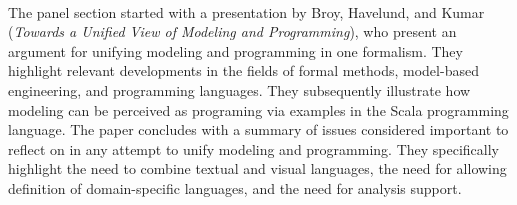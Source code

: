 

\ \hline \ %

The panel section started with a presentation by
Broy, Havelund, and Kumar
\cite{isola-2016-broy}
({\em Towards a Unified View of Modeling and Programming}),
who present an argument for unifying modeling and programming in 
one formalism. They highlight relevant developments in the fields 
of formal methods, model-based engineering, and programming 
languages. They subsequently illustrate how modeling can be 
perceived as programing via examples in the Scala 
programming language. The paper concludes with a summary of
issues considered important to reflect on in any attempt to 
unify modeling and programming. They specifically highlight
the need to combine textual and visual languages, the need for
allowing definition of domain-specific languages, and the need for analysis support.

\done{}